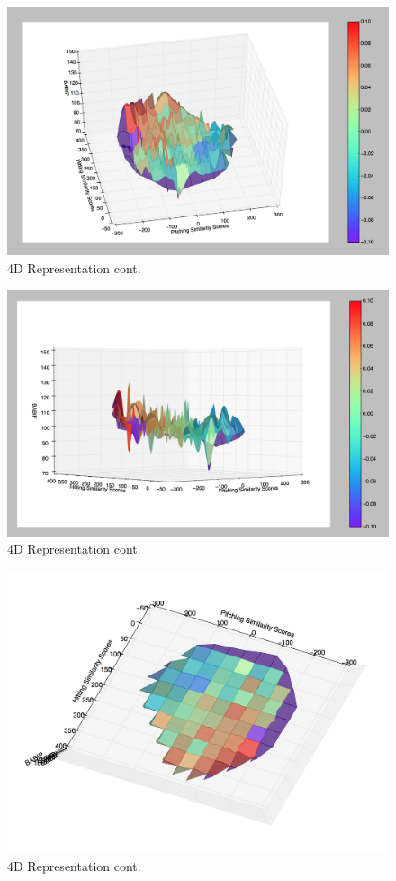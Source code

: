 \documentclass[12pt]{article}
\numberwithin{equation}{subsection}
\begin{document}
\begin{figure}[H]
	\centering
    \includegraphics[width=0.9\linewidth]{4d2}
    \caption{4D Representation cont.}
\end{figure}

\begin{figure}[H]
	\centering
    \includegraphics[width=0.9\linewidth]{4d3}
    \caption{4D Representation cont.}
\end{figure}

\begin{figure}[H]
	\centering
    \includegraphics[width=0.9\linewidth]{4d4}
    \caption{4D Representation cont.}
\end{figure}
\end{document}
